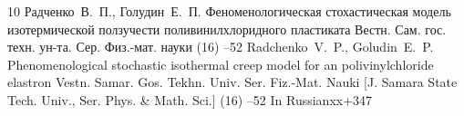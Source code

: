 \begin{thebibliography}{10}
\by Радченко~В.~П., Голудин~Е.~П.
\paper Феноменологическая стохастическая модель изотермической ползучести поливинилхлоридного пластиката
\jour Вестн. Сам. гос. техн. ун-та. Сер. Физ.-мат. науки
(16)
--52
\misctransl
\by Radchenko~V.~P., Goludin~E.~P.
\paper Phenomenological stochastic isothermal creep model for an polivinylchloride elastron
\jour Vestn. Samar. Gos. Tekhn. Univ. Ser. Fiz.-Mat. Nauki \rm [J. Samara State Tech. Univ., Ser. Phys. \& Math. Sci.]
(16)
--52
\lang In Russianxx+347


\end{thebibliography}


\newpage

\makeentitle

\vspace{-5mm}






